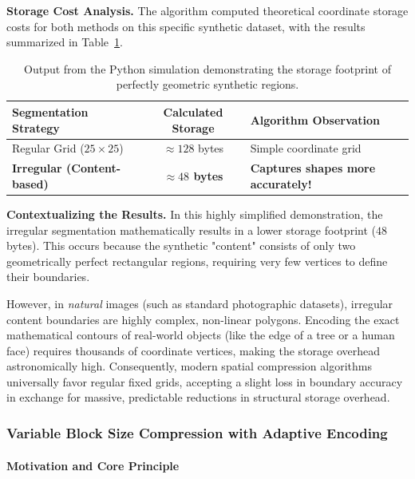 \vspace{1em}
\noindent\textbf{Storage Cost Analysis.} The algorithm computed theoretical coordinate storage costs for both methods on this specific synthetic dataset, with the results summarized in Table~\ref{tab:storage_demo}.

\begin{table}[H]
    \centering
    \begin{tabular}{l c l}
        \toprule
        \textbf{Segmentation Strategy} & \textbf{Calculated Storage} & \textbf{Algorithm Observation} \\
        \midrule
        Regular Grid ($25 \times 25$) & $\approx 128$ bytes & Simple coordinate grid \\
        \textbf{Irregular (Content-based)} & \textbf{$\approx 48$ bytes} & \textbf{Captures shapes more accurately!} \\
        \bottomrule
    \end{tabular}
    \caption{Output from the Python simulation demonstrating the storage footprint of perfectly geometric synthetic regions.}
    \label{tab:storage_demo}
\end{table}

\vspace{1em}
\noindent\textbf{Contextualizing the Results.} In this highly simplified demonstration, the irregular segmentation mathematically results in a lower storage footprint ($48$ bytes). This occurs because the synthetic "content" consists of only two geometrically perfect rectangular regions, requiring very few vertices to define their boundaries. 

However, in \textit{natural} images (such as standard photographic datasets), irregular content boundaries are highly complex, non-linear polygons. Encoding the exact mathematical contours of real-world objects (like the edge of a tree or a human face) requires thousands of coordinate vertices, making the storage overhead astronomically high. Consequently, modern spatial compression algorithms universally favor regular fixed grids, accepting a slight loss in boundary accuracy in exchange for massive, predictable reductions in structural storage overhead.

\subsubsection{Variable Block Size Compression with Adaptive Encoding}

\paragraph{Motivation and Core Principle}

